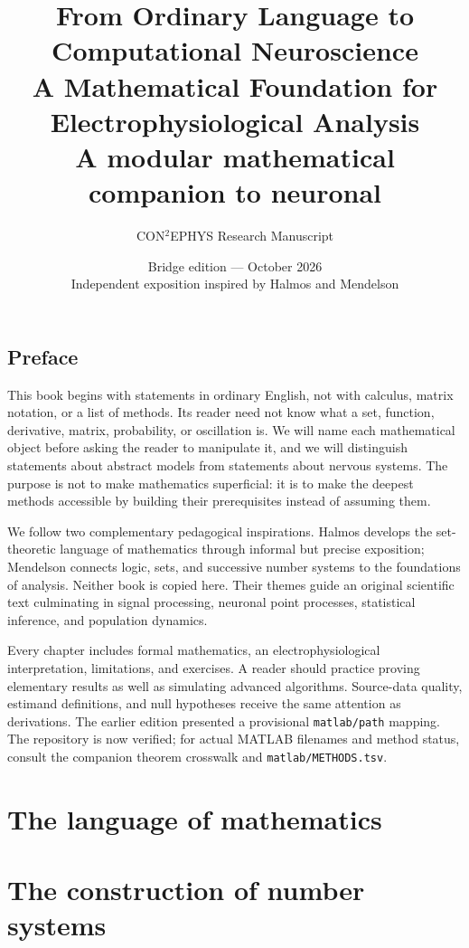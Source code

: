 \documentclass[11pt,a4paper,oneside,openany]{book}
\title{\Huge From Ordinary Language to\\ Computational Neuroscience\\[1em]\Large A Mathematical Foundation for Electrophysiological Analysis\\[0.5em]\normalsize A modular mathematical companion to neuronal}
\author{CON$^2$EPHYS Research Manuscript}
\date{Bridge edition --- October 2026\\\small Independent exposition inspired by Halmos and Mendelson}
\numberwithin{equation}{chapter}
\theoremstyle{definition}
\begin{document}
\frontmatter
\maketitle
\chapter*{Preface}
This book begins with statements in ordinary English, not with calculus, matrix notation, or a list of methods. Its reader need not know what a set, function, derivative, matrix, probability, or oscillation is. We will name each mathematical object before asking the reader to manipulate it, and we will distinguish statements about abstract models from statements about nervous systems. The purpose is not to make mathematics superficial: it is to make the deepest methods accessible by building their prerequisites instead of assuming them.

We follow two complementary pedagogical inspirations. Halmos develops the set-theoretic language of mathematics through informal but precise exposition; Mendelson connects logic, sets, and successive number systems to the foundations of analysis. Neither book is copied here. Their themes guide an original scientific text culminating in signal processing, neuronal point processes, statistical inference, and population dynamics.

Every chapter includes formal mathematics, an electrophysiological interpretation, limitations, and exercises. A reader should practice proving elementary results as well as simulating advanced algorithms. Source-data quality, estimand definitions, and null hypotheses receive the same attention as derivations. The earlier edition presented a provisional \texttt{matlab/path} mapping. The repository is now verified; for actual MATLAB filenames and method status, consult the companion theorem crosswalk and \texttt{matlab/METHODS.tsv}.
\tableofcontents

\mainmatter
\part{The language of mathematics}







\part{The construction of number systems}






\end{document}
